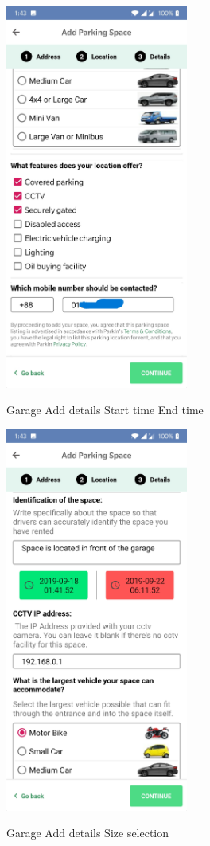 \documentclass[12pt, english]{article}
\begin{document}
\begin{figure}[h!]
        \begin{minipage}[b]{1\linewidth}
        \centering
        \includegraphics[width=6cm]{GarageAdd/DetailsFragment1.jpg}
        \label{arch9}
        \caption{Garage Add details Start time End time}
        \end{minipage}
\end{figure}
\begin{figure}[h!]
        \begin{minipage}[b]{1\linewidth}
        \centering
        \includegraphics[width=6cm]{GarageAdd/DetailsFragment2.jpg}
        \label{arch10}
        \caption{Garage Add details Size selection}
        \end{minipage}
\end{figure}
\newpage
\end{document}
